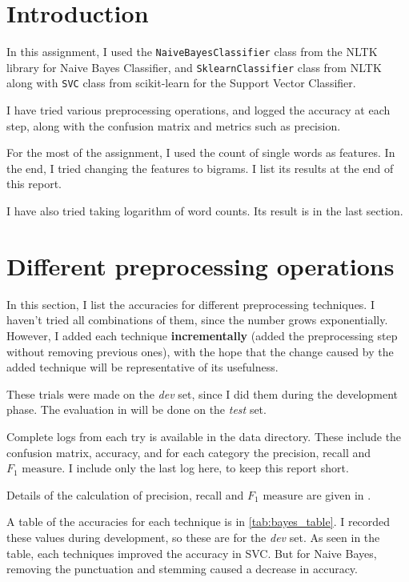 \section{Introduction}

In this assignment, I used the \texttt{NaiveBayesClassifier} class from the NLTK library for Naive Bayes Classifier, and \texttt{SklearnClassifier} class from NLTK along with \texttt{SVC} class from scikit-learn for the Support Vector Classifier.

I have tried various preprocessing operations, and logged the accuracy at each step, along with the confusion matrix and metrics such as precision.

For the most of the assignment, I used the count of single words as features. In the end, I tried changing the features to bigrams. I list its results at the end of this report.

I have also tried taking logarithm of word counts. Its result is in the last section.

\section{Different preprocessing operations}
\label{sec:preprocessing}

In this section, I list the accuracies for different preprocessing techniques. I haven't tried all combinations of them, since the number grows exponentially. However, I added each technique \textbf{incrementally} (added the preprocessing step without removing previous ones), with the hope that the change caused by the added technique will be representative of its usefulness.

These trials were made on the \emph{dev} set, since I did them during the development phase. The evaluation in  will be done on the \emph{test} set.

Complete logs from each try is available in the data directory. These include the confusion matrix, accuracy, and for each category the precision, recall and $F_1\text{ measure}$. I include only the last log here, to keep this report short.

Details of the calculation of precision, recall and $F_1\text{ measure}$ are given in .

A table of the accuracies for each technique is in \autoref{tab:bayes_table}. I recorded these values during development, so these are for the \emph{dev} set. As seen in the table, each techniques improved the accuracy in SVC. But for Naive Bayes, removing the punctuation and stemming caused a decrease in accuracy.

